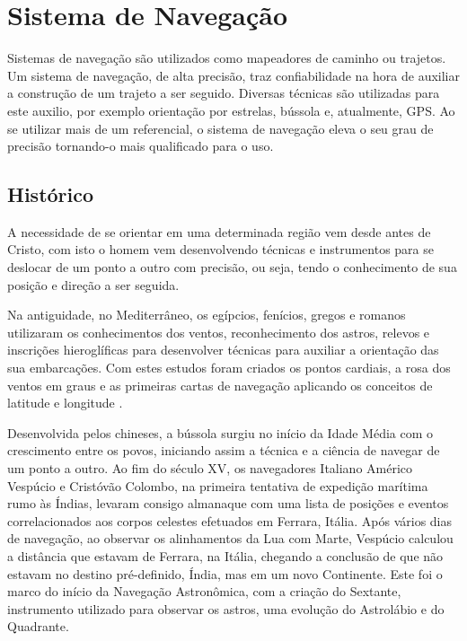 %
%

\chapter{Sistema de Navegação}

Sistemas de navegação são utilizados como mapeadores de caminho ou trajetos. Um sistema de navegação, de alta precisão, traz confiabilidade na hora de auxiliar a construção de um trajeto a ser seguido.
Diversas técnicas são utilizadas para este auxilio, por exemplo orientação por estrelas, bússola e, atualmente, GPS. Ao se utilizar mais de um referencial, o sistema de navegação eleva o seu grau de precisão tornando-o mais qualificado para o uso.

\section{Histórico}

A necessidade de se orientar em uma determinada região vem desde antes de Cristo, com isto o homem vem desenvolvendo técnicas e instrumentos para se deslocar de um ponto a outro com precisão, ou seja, tendo o conhecimento de sua posição e direção a ser seguida.

Na antiguidade, no Mediterrâneo, os egípcios, fenícios, gregos e romanos utilizaram os conhecimentos dos ventos, reconhecimento dos astros, relevos e inscrições hieroglíficas para desenvolver técnicas para auxiliar a orientação das sua embarcações. Com estes estudos foram criados os pontos cardiais, a rosa dos ventos em graus e as primeiras cartas de navegação aplicando os conceitos de latitude e longitude \cite{selles1994instrumentos}.

Desenvolvida pelos chineses, a bússola surgiu no início da Idade Média com o crescimento entre os povos, iniciando assim a técnica e a ciência de navegar de um ponto a outro.
Ao fim do século XV, os navegadores Italiano Américo Vespúcio e Cristóvão Colombo, na primeira tentativa de expedição marítima rumo às Índias, levaram consigo almanaque com uma lista de posições e eventos correlacionados aos corpos celestes efetuados em Ferrara, Itália. Após vários dias de navegação, ao observar os alinhamentos da Lua com Marte, Vespúcio calculou a distância que estavam de Ferrara, na Itália, chegando a conclusão de que não estavam no destino pré-definido, Índia, mas em um novo Continente\cite{de2000astronomia}. Este foi o marco do início da Navegação Astronômica, com a criação do Sextante, instrumento utilizado para observar os astros, uma evolução do Astrolábio e do Quadrante\cite{forcca2007evoluccao}.

